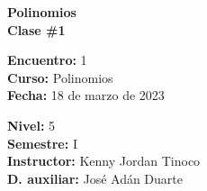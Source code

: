 \begin{center} \textbf
{
    \Large Polinomios \\ \vspace{2mm}Clase \#1
}
\end{center}

\begin{multicols}{2}
{
    \textbf{Encuentro:} 1\\
    \textbf{Curso:} Polinomios\\
    \textbf{Fecha:} 18 de marzo de 2023\\
    \begin{flushright}
        \textbf{Nivel:} 5\\
        \textbf{Semestre:} I\\
        \textbf{Instructor:} Kenny Jordan Tinoco\\
        \textbf{D. auxiliar: }José Adán Duarte
    \end{flushright}
}
\end{multicols}

\thispagestyle{first-page-style}
